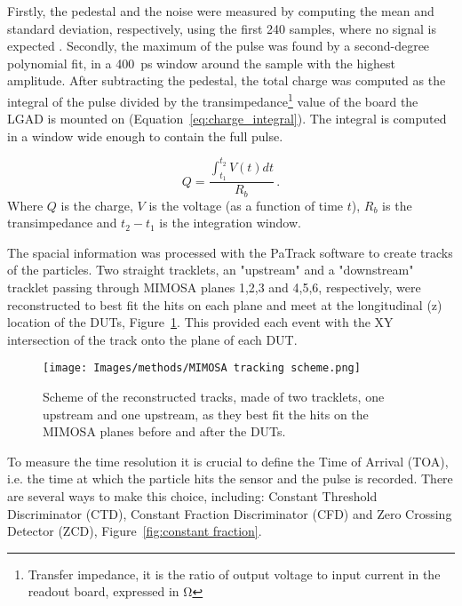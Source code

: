 Firstly, the pedestal and the noise were measured by computing the mean and standard deviation, respectively, using the first 240 samples, where no signal is expected \cite{Allaire:2018bof}. Secondly, the maximum of the pulse was found by a second-degree polynomial fit, in a \qty{400}{\pico\second} window around the sample with the highest amplitude. After subtracting the pedestal, the total charge was computed as the integral of the pulse divided by the transimpedance\footnote{Transfer impedance, it is the ratio of output voltage to input current in the readout board, expressed in \unit{\ohm}} value of the board the LGAD is mounted on (Equation~\ref{eq:charge_integral}). The integral is computed in a window wide enough to contain the full pulse.

\begin{equation}\label{eq:charge_integral}
    Q = \frac{\int_{t_1}^{t_2} V(t)dt}{R_b} \, .
\end{equation}
Where \(Q\) is the charge, \(V\) is the voltage (as a function of time \(t\)), \(R_b\) is the transimpedance and \(t_2-t_1\) is the integration window.

The spacial information was processed with the PaTrack software to create tracks of the particles. Two straight tracklets, an "upstream" and a "downstream" tracklet passing through MIMOSA planes 1,2,3 and 4,5,6, respectively, were reconstructed to best fit the hits on each plane and meet at the longitudinal (z) location of the DUTs, Figure~\ref{fig:mimosa_tracking}. This provided each event with the XY intersection of the track onto the plane of each DUT. 

\begin{figure}[h!btp]
    \centering
    \texttt{[image: Images/methods/MIMOSA tracking scheme.png]}
    \captionsetup{width=\captionwidth}
    \caption{Scheme of the reconstructed tracks, made of two tracklets, one upstream and one upstream, as they best fit the hits on the MIMOSA planes before and after the DUTs.}
    \label{fig:mimosa_tracking}
\end{figure} 


To measure the time resolution it is crucial to define the Time of Arrival (TOA), i.e. the time at which the particle hits the sensor and the pulse is recorded. There are several ways to make this choice, including: Constant Threshold Discriminator (CTD), Constant Fraction Discriminator (CFD) and Zero Crossing Detector (ZCD), Figure~\ref{fig:constant fraction}.

